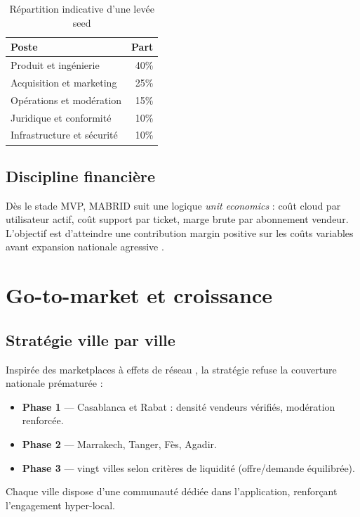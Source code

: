\begin{table}[H]
  \centering
  \caption{Répartition indicative d'une levée seed}
  \label{tab:use-of-funds}
  \begin{tabular}{lr}
    \toprule
    \textbf{Poste} & \textbf{Part} \\
    \midrule
    Produit et ingénierie & 40\% \\
    Acquisition et marketing & 25\% \\
    Opérations et modération & 15\% \\
    Juridique et conformité & 10\% \\
    Infrastructure et sécurité & 10\% \\
    \bottomrule
  \end{tabular}
\end{table}

\subsection{Discipline financière}

Dès le stade MVP, MABRID suit une logique \emph{unit economics} : coût cloud par utilisateur actif, coût support par ticket, marge brute par abonnement vendeur. L'objectif est d'atteindre une contribution margin positive sur les coûts variables avant expansion nationale agressive \parencite{skok2014saas}.

\section{Go-to-market et croissance}

\subsection{Stratégie ville par ville}

Inspirée des marketplaces à effets de réseau \parencite{chen2018liquidity}, la stratégie refuse la couverture nationale prématurée :
\begin{itemize}
  \item \textbf{Phase 1} --- Casablanca et Rabat : densité vendeurs vérifiés, modération renforcée.
  \item \textbf{Phase 2} --- Marrakech, Tanger, Fès, Agadir.
  \item \textbf{Phase 3} --- vingt villes selon critères de liquidité (offre/demande équilibrée).
\end{itemize}

Chaque ville dispose d'une communauté dédiée dans l'application, renforçant l'engagement hyper-local.


